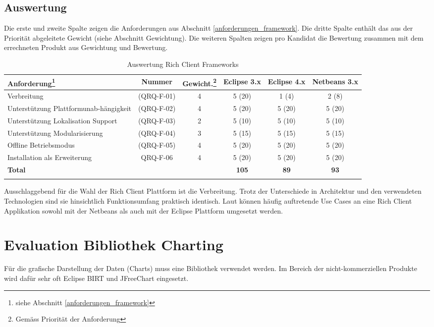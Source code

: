 \subsection{Auswertung}
Die erste und zweite Spalte zeigen die Anforderungen aus Abschnitt \ref{anforderungen_framework}. Die dritte Spalte enthält das aus der Priorität abgeleitete Gewicht (siehe Abschnitt Gewichtung). Die weiteren Spalten zeigen pro Kandidat die Bewertung zusammen mit dem errechneten Produkt aus Gewichtung und Bewertung.
\begin{longtable}{|p{3cm}|c|c|c|c|c|}\hline
 \textbf{Anforderung\footnote{siehe Abschnitt \ref{anforderungen_framework}}} & \textbf{Nummer} &  \textbf{Gewicht.\footnote{Gemäss Priorität der Anforderung}} & \textbf{Eclipse 3.x} & \textbf{Eclipse 4.x} &  \textbf{Netbeans 3.x}\\\hline
   Verbreitung & (QRQ-F-01) & 4 & 5 (20) & 1 (4) & 2 (8)\\\hline
   Unterstützung Plattformunab-hängigkeit & (QRQ-F-02) & 4 & 5 (20) & 5 (20) & 5 (20)\\\hline
   Unterstützung Lokalisation Support & (QRQ-F-03) & 2 & 5 (10) & 5 (10) & 5 (10) \\\hline
   Unterstützung Modularisierung & (QRQ-F-04) & 3 & 5 (15) & 5 (15) & 5 (15) \\\hline
   Offline Betriebsmodus & (QRQ-F-05) & 4 & 5 (20) & 5 (20) & 5 (20) \\\hline
   Installation als Erweiterung & QRQ-F-06 & 4 & 5 (20) & 5 (20) & 5 (20) \\\hline
   \textbf{Total} & & & \textbf{105} & \textbf{89} & \textbf{93}\\\hline
    \caption{Auswertung Rich Client Frameworks}
\end{longtable}

Ausschlaggebend für die Wahl der Rich Client Plattform ist die Verbreitung. Trotz der Unterschiede in Architektur und den verwendeten Technologien sind sie hinsichtlich Funktionsumfang praktisch identisch. Laut \cite{toedter20071120} können häufig auftretende Use Cases an eine Rich Client Applikation sowohl mit der Netbeans als auch mit der Eclipse Plattform umgesetzt werden.


\section{Evaluation Bibliothek Charting}
Für die grafische Darstellung der Daten (Charts) muss eine Bibliothek verwendet werden. Im Bereich der nicht-kommerziellen Produkte wird dafür sehr oft Eclipse BIRT und JFreeChart eingesetzt.
